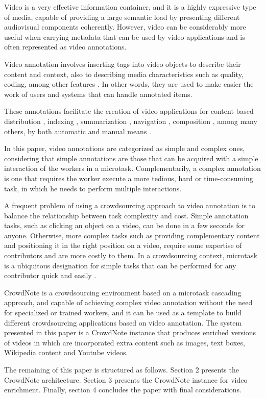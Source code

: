 Video is a very effective information container, and it is a highly expressive type of media, capable of providing a large semantic load by presenting different audiovisual components coherently\cite{162960}. However, video can be considerably more useful when carrying metadata that can be used by video applications and is often represented as video annotations.

Video annotation involves inserting tags into video objects to describe their content and context, also to describing media characteristics such as quality, coding, among other features \cite{Wang:2009:BDM:1652990.1653002}. In other words, they are used to make easier the work of users and systems that can handle annotated items. 

These annotations facilitate the creation of video applications for content-based distribution \cite{Zhang:2012:KIE:2339530.2339620}, indexing \cite{Zhang:2007:PRS:1290082.1290126}, summarization \cite{Fiao:2016:AGS:3001773.3001802}, navigation \cite{Goldman:2008}, composition \cite{Wilk:2015:VCC:2713168.2713178}, among many others, by both automatic and manual means \cite{Wang:2011:ALM:1899412.1899414}. 

In this paper, video annotations are categorized as simple and complex ones, considering that simple annotations are those that can be acquired with a simple interaction of the workers in a microtask. Complementarily, a complex annotation is one that requires the worker execute a more tedious, hard or time-consuming task, in which he needs to perform multiple interactions. 

A frequent problem of using a crowdsourcing approach to video annotation is to balance the relationship between task complexity and cost. Simple annotation tasks, such as clicking an object on a video, can be done in a few seconds for anyone. Otherwise, more complex tasks such as providing complementary content and positioning it in the right position on a video, require some expertise of contributors and are more costly to them. In a crowdsourcing context, microtask is a ubiquitous designation for simple tasks that can be performed for any contributor quick and easily \cite{Difallah:2015:DMC:2736277.2741685}.

CrowdNote is a crowdsourcing environment based on a microtask cascading approach\citep{172450}, and capable of achieving complex video annotation without the need for specialized or trained workers, and it can be used as a template to build different crowdsourcing applications based on video annotation. The system presented in this paper is a CrowdNote instance that produces enriched versions of videos in which are incorporated extra content such as images, text boxes, Wikipedia content and Youtube videos. 

The remaining of this paper is structured as follows. Section 2 presents the CrowdNote architecture. Section 3 presents the CrowdNote instance for video enrichment. Finally, section 4 concludes the paper with final considerations.
